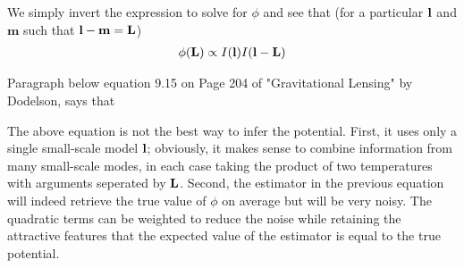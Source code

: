 \documentclass[12pt]{article}
\newcommand{\beqa}{\begin{eqnarray}}
\newcommand{\eeqa}{\end{eqnarray}}
\def\l{{\bf l}}
\def\L{{\bf L}}
\numberwithin{equation}{section}
\begin{document}
%
We simply invert the expression to solve for $ \phi $ and see that (for a particular $ \l $ and $ \textbf{m} $ such that $ \l  - \textbf{m} = \L$)
\beqa
\phi(\L) \propto I(\l) I(\l - \L)
\eeqa

Paragraph below equation 9.15 on Page 204 of "Gravitational Lensing" by Dodelson, says that

The above equation is not the best way to infer the potential. First, it uses only a single small-scale model $ \l $; obviously, it makes sense to combine information from many small-scale modes, in each case taking the product of two temperatures with arguments seperated by $ \L $. Second, the estimator in the previous equation will indeed retrieve the true value of $ \phi $ on average but will be very noisy. The quadratic terms can be weighted to reduce the noise while retaining the attractive features that the expected value of the estimator is equal to the true potential.
\end{document}
